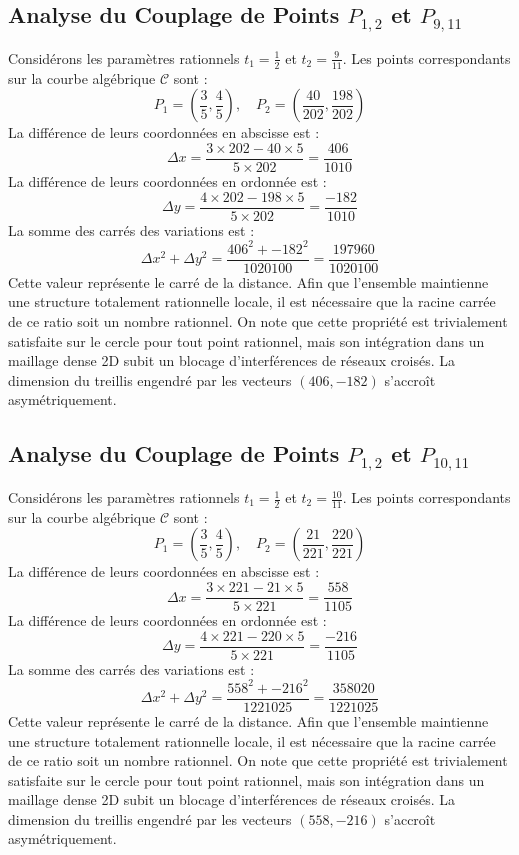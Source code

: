 \documentclass[12pt, a4paper]{article}
\begin{document}
\subsection{Analyse du Couplage de Points $P_{1,2}$ et $P_{9,11}$}
Considérons les paramètres rationnels $t_1 = \frac{1}{2}$ et $t_2 = \frac{9}{11}$.
Les points correspondants sur la courbe algébrique $\mathcal{C}$ sont :
$$ P_1 = \left( \frac{3}{5}, \frac{4}{5} \right), \quad P_2 = \left( \frac{40}{202}, \frac{198}{202} \right) $$
La différence de leurs coordonnées en abscisse est :
$$ \Delta x = \frac{3 \times 202 - 40 \times 5}{5 \times 202} = \frac{406}{1010} $$
La différence de leurs coordonnées en ordonnée est :
$$ \Delta y = \frac{4 \times 202 - 198 \times 5}{5 \times 202} = \frac{-182}{1010} $$
La somme des carrés des variations est :
$$ \Delta x^2 + \Delta y^2 = \frac{ 406^2 + -182^2 }{ 1020100 } = \frac{ 197960 }{ 1020100 } $$
Cette valeur représente le carré de la distance. Afin que l'ensemble maintienne une structure totalement rationnelle locale, il est nécessaire que la racine carrée de ce ratio soit un nombre rationnel. On note que cette propriété est trivialement satisfaite sur le cercle pour tout point rationnel, mais son intégration dans un maillage dense 2D subit un blocage d'interférences de réseaux croisés. La dimension du treillis engendré par les vecteurs $( 406, -182 )$ s'accroît asymétriquement.


\subsection{Analyse du Couplage de Points $P_{1,2}$ et $P_{10,11}$}
Considérons les paramètres rationnels $t_1 = \frac{1}{2}$ et $t_2 = \frac{10}{11}$.
Les points correspondants sur la courbe algébrique $\mathcal{C}$ sont :
$$ P_1 = \left( \frac{3}{5}, \frac{4}{5} \right), \quad P_2 = \left( \frac{21}{221}, \frac{220}{221} \right) $$
La différence de leurs coordonnées en abscisse est :
$$ \Delta x = \frac{3 \times 221 - 21 \times 5}{5 \times 221} = \frac{558}{1105} $$
La différence de leurs coordonnées en ordonnée est :
$$ \Delta y = \frac{4 \times 221 - 220 \times 5}{5 \times 221} = \frac{-216}{1105} $$
La somme des carrés des variations est :
$$ \Delta x^2 + \Delta y^2 = \frac{ 558^2 + -216^2 }{ 1221025 } = \frac{ 358020 }{ 1221025 } $$
Cette valeur représente le carré de la distance. Afin que l'ensemble maintienne une structure totalement rationnelle locale, il est nécessaire que la racine carrée de ce ratio soit un nombre rationnel. On note que cette propriété est trivialement satisfaite sur le cercle pour tout point rationnel, mais son intégration dans un maillage dense 2D subit un blocage d'interférences de réseaux croisés. La dimension du treillis engendré par les vecteurs $( 558, -216 )$ s'accroît asymétriquement.
\end{document}
